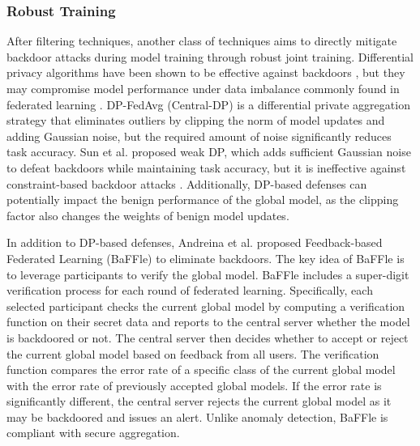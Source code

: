 \documentclass[conference]{IEEEtran}
\begin{document}
\subsubsection{Robust Training}  
After filtering techniques, another class of techniques aims to directly mitigate backdoor attacks during model training through robust joint training. 
Differential privacy algorithms have been shown to be effective against backdoors \cite{b82}, but they may compromise model performance under data imbalance 
commonly found in federated learning \cite{b83}. DP-FedAvg \cite{b84} (Central-DP) is a differential private aggregation strategy that eliminates 
outliers by clipping the norm of model updates and adding Gaussian noise, but the required amount of noise significantly reduces 
task accuracy. Sun et al. \cite{b27} proposed weak DP, which adds sufficient Gaussian noise to defeat backdoors while maintaining task accuracy, 
but it is ineffective against constraint-based backdoor attacks \cite{b25}. 
Additionally, DP-based defenses can potentially impact the benign performance of the global model, 
as the clipping factor also changes the weights of benign model updates.   

In addition to DP-based defenses, Andreina et al. \cite{b85}proposed Feedback-based Federated Learning (BaFFle) to eliminate backdoors.  
The key idea of BaFFle is to leverage participants to verify the global model. BaFFle includes a super-digit verification process for each 
round of federated learning. Specifically, each selected participant checks the current global model by computing a verification function on 
their secret data and reports to the central server whether the model is backdoored or not. The central server then decides whether 
to accept or reject the current global model based on feedback from all users. The verification function compares the error rate of 
a specific class of the current global model with the error rate of previously accepted global models. If the error rate is significantly different, 
the central server rejects the current global model as it may be backdoored and issues an alert. Unlike anomaly detection, BaFFle is compliant with secure aggregation.
\end{document}
